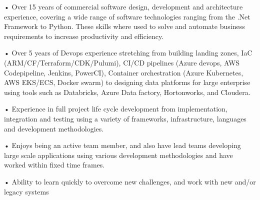 

\begin{cvparagraph}

• Over 15 years of commercial software design, development and architecture experience, covering a wide range of software technologies ranging from the .Net Framework to Python. These skills where used to solve and automate business requirements to increase productivity and efficiency. 
 
• Over 5 years of Devops experience stretching from building landing zones, IaC (ARM/CF/Terraform/CDK/Pulumi), CI/CD pipelines (Azure devops, AWS Codepipeline, Jenkins, PowerCI), Container orchestration (Azure Kubernetes, AWS EKS/ECS, Docker swarm) to designing data platforms for large enterprise using tools such as Databricks, Azure Data factory, Hortonworks, and Cloudera.

• Experience in full project life cycle development from implementation, integration and testing using a variety of frameworks, infrastructure, languages and development methodologies.

• Enjoys being an active team member, and also have lead teams developing large scale applications using various development methodologies and have worked within fixed time frames.

• Ability to learn quickly to overcome new challenges, and work with new and/or legacy systems
\end{cvparagraph}
